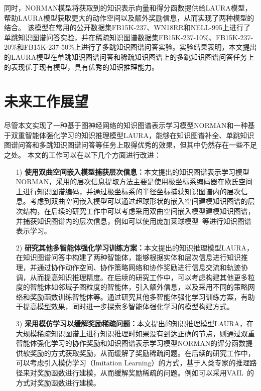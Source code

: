 \documentclass[algorithmlist, AutoFakeBold, AutoFakeSlant, figurelist, tablelist, nomlist, engineering]{seuthesix}
\begin{document}
\begin{itemize}
  同时，NORMAN模型将获取到的知识表示向量和得分函数提供给LAURA模型，帮助LAURA模型获取更大的动作空间以及额外奖励信息，从而实现了两种模型的结合。
  该模型在常用的公开数据集FB15K-237、WN18RR和NELL-995上进行了单跳知识图谱问答实验，并在稀疏知识图谱数据集FB15K-237-10\%、FB15K-237-20\%和FB15K-237-50\%上进行了多跳知识图谱问答实验。实验结果表明，本文提出的LAURA模型在单跳知识图谱问答和稀疏知识图谱上的多跳知识图谱问答任务上的表现优于现有模型，具有优秀的知识推理能力。
\end{itemize}

\section{未来工作展望}
尽管本文实现了一种基于图神经网络的知识图谱表示学习模型NORMAN和一种基于双重智能体强化学习的知识推理模型LAURA，能够在知识图谱补全、单跳知识图谱问答和多跳知识图谱问答等任务上取得优秀的效果，但其中仍然存在一些不足之处。
本文的工作可以在以下几个方面进行改进：
\begin{itemize}
  \item [1)]\textbf{使用双曲空间嵌入模型捕获层次信息：}本文提出的知识图谱表示学习模型NORMAN，采用的层次信息提取方法主要是使用极坐标系编码器在欧氏空间上进行知识图谱编码，并通过极坐标系的半径坐标捕获知识图谱内的层次信息。考虑到双曲空间嵌入模型可以通过超球形状的嵌入空间建模知识图谱的层次结构，在后续的研究工作中可以考虑采用双曲空间嵌入模型建模知识图谱，并捕获知识图谱内的层次信息，例如可以使用庞加莱球模型~\cite{abramowicz2002poincare}等进行知识图谱表示学习。
  \item [2)]\textbf{研究其他多智能体强化学习训练方案：}本文提出的知识推理模型LAURA，在知识图谱问答中构建了两种智能体，能够根据实体和层次信息进行知识推理，并通过协作动作空间、协作策略网络和协作奖励进行信息交流和轨迹协调，从而提高知识推理精度。在后续的研究工作中，可以考虑构建其他更多粒度的智能体如邻域子图粒度的智能体，引入额外信息，以及采用不同的策略网络和奖励函数训练智能体等。通过研究其他多智能体强化学习训练方案，有助于提高模型效果，同时进一步探索多智能体强化学习的模型构建方式。
  \item [3)]\textbf{采用模仿学习以缓解奖励稀疏问题：}本文提出的知识推理模型LAURA，在大规模稀疏知识图谱上进行知识推理时如果没有到达正确的节点，则通过双重智能体强化学习的协作奖励和知识图谱表示学习模型NORMAN的评分函数提供软奖励的方式获取奖励，从而缓解了奖励稀疏问题。在后续的研究工作中，可以考虑引入模仿学习（Imitation Learning）的方式，基于人类专家的推理路径来对奖励函数进行建模，从而缓解奖励稀疏的问题。例如可以采用VAIL~\cite{pengvariational}的方式对奖励函数进行建模。
\end{itemize}
\end{document}
